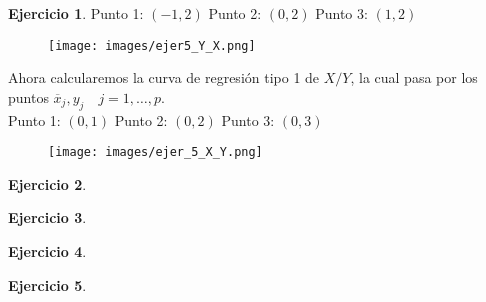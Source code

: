 \documentclass[a4paper, 12pt]{article}
\theoremstyle{definition}
\newtheorem{ej}{Ejercicio}
\begin{document}
\begin{ej}
Punto 1: \((-1, 2)\) \hspace{1cm} Punto 2: \((0, 2)\) \hspace{1cm} Punto 3: \((1, 2)\)

\newpage

\begin{figure}[!h]
	\centering
	\texttt{[image: images/ejer5\_Y\_X.png]}
\end{figure}

\par 

Ahora calcularemos la curva de regresión tipo 1 de \(X/Y\), la cual pasa por los puntos \(\overline{x}_j, y_j \quad j = 1, \dotsc, p\). \\

Punto 1: \((0, 1)\) \hspace{1cm} Punto 2: \((0, 2)\) \hspace{1cm} Punto 3: \((0, 3)\)

\begin{figure}[!h]
	\centering
	\texttt{[image: images/ejer\_5\_X\_Y.png]}
\end{figure}

\end{ej}

\begin{ej}

\end{ej}

\begin{ej}

\end{ej}

\begin{ej}

\end{ej}

\begin{ej}

\end{ej}
\end{document}
